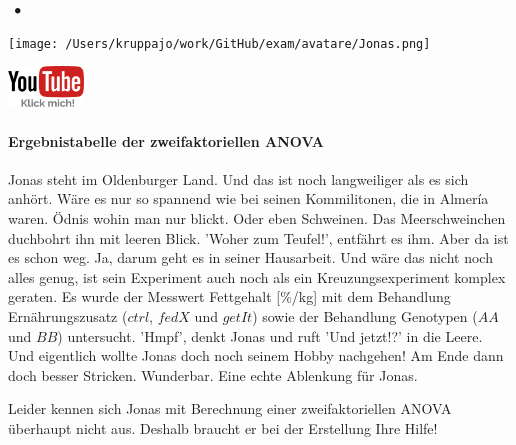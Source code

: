 \documentclass[a4paper, 9pt]{scrartcl}\usepackage[]{graphicx}\usepackage[]{xcolor}
\begin{document}
 
\ifcollection
\begin{flushright}
\tiny\vspace{-3Ex}
\textbf{\examinhaltstart}
\exammodulestatversuch $\;\bullet$
\exammodulebiostat
\vspace{-4Ex}
\end{flushright}
\begin{minipage}[t]{0.5\textwidth}
\texttt{[image: /Users/kruppajo/work/GitHub/exam/avatare/Jonas.png]}
\end{minipage}
\begin{minipage}[t]{0.5\textwidth}
\hfill
\href{https://youtu.be/1uZsKAipACI}{\includegraphics[width = 2cm]{img/youtube}}
\end{minipage}
\vspace{-3Ex}
\fi



\ifcollection
\paragraph{Ergebnistabelle der zweifaktoriellen ANOVA}
\fi

Jonas steht im Oldenburger Land. Und das ist noch langweiliger als es sich anhört. Wäre es nur so spannend wie bei seinen Kommilitonen, die in Almería waren. Ödnis wohin man nur blickt. Oder eben Schweinen. Das Meerschweinchen duchbohrt ihn mit leeren Blick. 'Woher zum Teufel!', entfährt es ihm. Aber da ist es schon weg. Ja, darum geht es in seiner Hausarbeit. Und wäre das nicht noch alles genug, ist sein Experiment auch noch als ein Kreuzungsexperiment komplex geraten. Es wurde der Messwert Fettgehalt [\%/kg] mit dem Behandlung Ernährungszusatz ($ctrl$, $fedX$ und $getIt$) sowie der Behandlung Genotypen ($AA$ und $BB$) untersucht. 'Hmpf', denkt Jonas und ruft 'Und jetzt!?' in die Leere. Und eigentlich wollte Jonas doch noch seinem Hobby nachgehen! Am Ende dann doch besser Stricken. Wunderbar. Eine echte Ablenkung für Jonas.



\vspace{1ex}

Leider kennen sich Jonas mit Berechnung einer zweifaktoriellen ANOVA überhaupt nicht aus. Deshalb braucht er bei der Erstellung Ihre Hilfe! 
\end{document}
